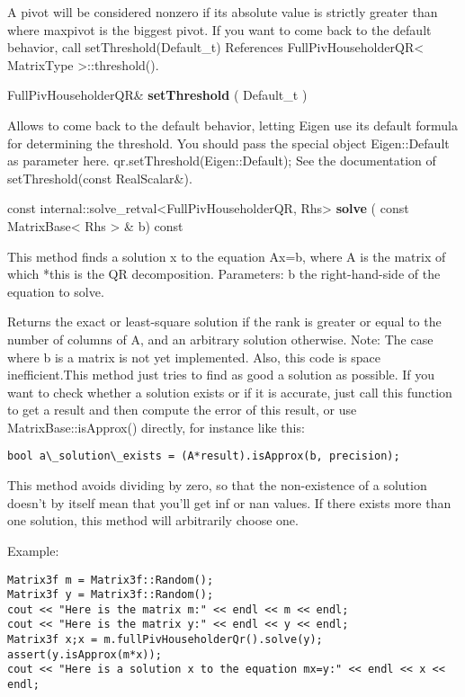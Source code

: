 A pivot will be considered nonzero if its absolute value is strictly greater than  where maxpivot is the biggest pivot.
If you want to come back to the default behavior, call setThreshold(Default\_t) 
References FullPivHouseholderQR< MatrixType >::threshold().


\vspace{0.3cm}
FullPivHouseholderQR\& \textbf{setThreshold}  ( Default\_t  )   

Allows to come back to the default behavior, letting Eigen use its default formula for determining the threshold.
You should pass the special object Eigen::Default as parameter here. 
qr.setThreshold(Eigen::Default); See the documentation of setThreshold(const RealScalar\&). 


\vspace{0.3cm}
const internal::solve\_retval<FullPivHouseholderQR, Rhs> \textbf{solve}  ( const MatrixBase< Rhs > \&  b)  const 

This method finds a solution x to the equation Ax=b, where A is the matrix of which *this is the QR decomposition.
Parameters: b the right-hand-side of the equation to solve. 

Returns the exact or least-square solution if the rank is greater or equal to the number of columns of A, and an arbitrary solution otherwise.
Note: The case where b is a matrix is not yet implemented. Also, this code is space inefficient.This method just tries to find as good a solution as possible. If you want to check whether a solution exists or if it is accurate, just call this function to get a result and then compute the error of this result, or use MatrixBase::isApprox() directly, for instance like this:

\begin{verbatim}
bool a\_solution\_exists = (A*result).isApprox(b, precision); 
\end{verbatim}

This method avoids dividing by zero, so that the non-existence of a solution doesn't by itself mean that you'll get inf or nan values.
If there exists more than one solution, this method will arbitrarily choose one.


Example:
\begin{lstlisting}
Matrix3f m = Matrix3f::Random();
Matrix3f y = Matrix3f::Random();
cout << "Here is the matrix m:" << endl << m << endl;
cout << "Here is the matrix y:" << endl << y << endl;
Matrix3f x;x = m.fullPivHouseholderQr().solve(y);
assert(y.isApprox(m*x));
cout << "Here is a solution x to the equation mx=y:" << endl << x << endl;
\end{lstlisting}

